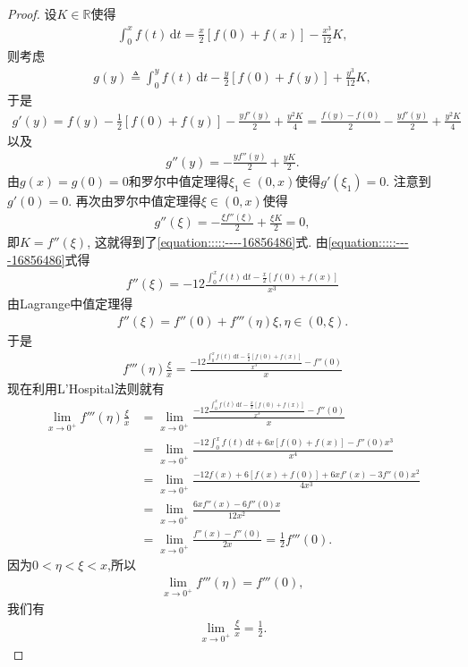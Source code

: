 \documentclass[../../main.tex]{subfiles}%
\begin{document}
\begin{proof}

设$K \in \mathbb{R}$使得
\begin{align*}
\int_0^x f(t) \,\mathrm{d}t = \frac{x}{2}[f(0) + f(x)] - \frac{x^3}{12}K,
\end{align*}
则考虑
\begin{align*}
g(y) \triangleq \int_0^y f(t) \,\mathrm{d}t - \frac{y}{2}[f(0) + f(y)] + \frac{y^3}{12}K,
\end{align*}
于是
\begin{align*}
g'(y) = f(y) - \frac{1}{2}[f(0) + f(y)] - \frac{y f'(y)}{2} + \frac{y^2 K}{4} = \frac{f(y) - f(0)}{2} - \frac{y f'(y)}{2} + \frac{y^2 K}{4}
\end{align*}
以及
\begin{align*}
g''(y) = -\frac{y f''(y)}{2} + \frac{y K}{2}.
\end{align*}
由$g(x) = g(0) = 0$和罗尔中值定理得$\xi_1 \in (0,x)$使得$g'(\xi_1) = 0$. 注意到$g'(0) = 0$. 再次由罗尔中值定理得$\xi \in (0,x)$使得
\begin{align*}
g''(\xi) = -\frac{\xi f''(\xi)}{2} + \frac{\xi K}{2} = 0,
\end{align*}
即$K = f''(\xi)$, 这就得到了\eqref{equation:::::----16856486}式.
由\eqref{equation:::::----16856486}式得
\begin{align*}
f''(\xi) = -12 \frac{\int_0^x f(t) \,\mathrm{d}t - \frac{x}{2}[f(0) + f(x)]}{x^3}
\end{align*}
由Lagrange中值定理得
\begin{align*}
f''(\xi) = f''(0) + f'''(\eta) \xi, \eta \in (0,\xi).
\end{align*}
于是
\begin{align*}
f'''(\eta) \frac{\xi}{x} = \frac{-12 \frac{\int_0^x f(t) \,\mathrm{d}t - \frac{x}{2}[f(0) + f(x)]}{x^3} - f''(0)}{x}
\end{align*}
现在利用L'Hospital法则就有
\begin{align*}
\lim_{x \to 0^+} f'''(\eta) \frac{\xi}{x} &= \lim_{x \to 0^+} \frac{-12 \frac{\int_0^x f(t) \,\mathrm{d}t - \frac{x}{2}[f(0) + f(x)]}{x^3} - f''(0)}{x} \\
&= \lim_{x \to 0^+} \frac{-12 \int_0^x f(t) \,\mathrm{d}t + 6x [f(0) + f(x)] - f''(0) x^3}{x^4} \\
&= \lim_{x \to 0^+} \frac{-12 f(x) + 6 [f(x) + f(0)] + 6x f'(x) - 3 f''(0) x^2}{4x^3} \\
&= \lim_{x \to 0^+} \frac{6x f''(x) - 6 f''(0) x}{12x^2} \\
&= \lim_{x \to 0^+} \frac{f''(x) - f''(0)}{2x} = \frac{1}{2} f'''(0).
\end{align*}
因为$0<\eta<\xi<x$,所以
\begin{align*}
\lim_{x \to 0^+} f'''(\eta) = f'''(0),
\end{align*}
我们有
\begin{align*}
\lim_{x \to 0^+} \frac{\xi}{x} = \frac{1}{2}.
\end{align*}

\end{proof}
\end{document}
